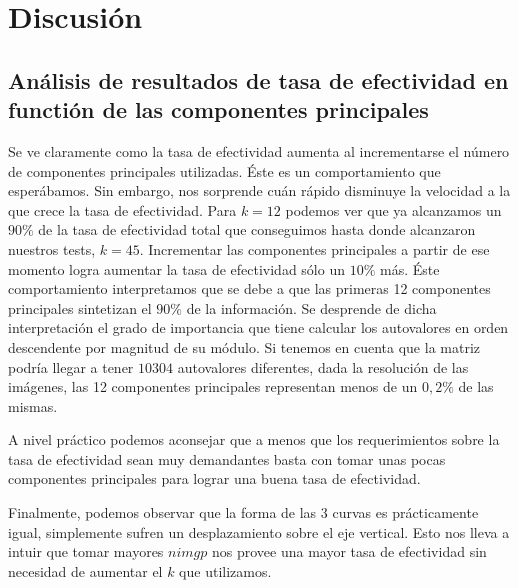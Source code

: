 \section{Discusión}

\subsection{Análisis de resultados de tasa de efectividad en functión de las componentes principales}
Se ve claramente como la tasa de efectividad aumenta al incrementarse el número de componentes principales utilizadas. Éste es un comportamiento
que esperábamos. Sin embargo, nos sorprende cuán rápido disminuye la velocidad a la que crece la tasa de efectividad. Para $k = 12$ podemos ver
que ya alcanzamos un $90\%$ de la tasa de efectividad total que conseguimos hasta donde alcanzaron nuestros tests, $k = 45$. Incrementar las 
componentes principales a partir de ese momento logra aumentar la tasa de efectividad sólo un $10\%$ más. Éste comportamiento interpretamos
que se debe a que las primeras 12 componentes principales sintetizan el $90\%$ de la información. Se desprende de dicha interpretación
el grado de importancia que tiene calcular los autovalores en orden descendente por magnitud de su módulo. Si tenemos en cuenta que la matriz
podría llegar a tener $10304$ autovalores diferentes, dada la resolución de las imágenes, las 12 componentes principales representan
menos de un $0,2\%$ de las mismas.
\par
A nivel práctico podemos aconsejar que a menos que los requerimientos sobre la tasa de efectividad sean muy demandantes basta con 
tomar unas pocas componentes principales para lograr una buena tasa de efectividad.
\par
Finalmente, podemos observar que la forma de las 3 curvas es prácticamente igual, simplemente sufren un desplazamiento sobre el eje
vertical. Esto nos lleva a intuir que tomar mayores $nimgp$ nos provee una mayor tasa de efectividad sin necesidad de aumentar el $k$ que
utilizamos.

